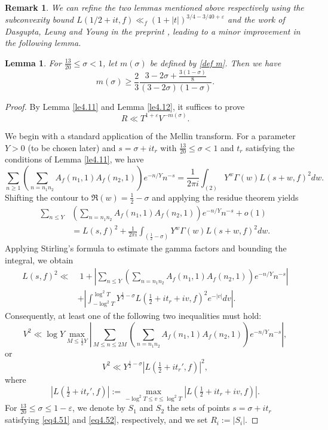 \documentclass[10pt,leqno]{amsart}
\numberwithin{equation}{section}
\newtheorem{lemma}[definition]{{Lemma}}
\newtheorem{remark}{{Remark}}
\begin{document}
\begin{remark}
    We can refine the two lemmas mentioned above respectively using the subconvexity bound $L(1/2+it,f)\ll_f(1+\left|t\right|)^{3/4-3/40+\varepsilon}$ \cite[Theorem 1.1]{MR4270876} and the work of Dasgupta, Leung and Young in the preprint \cite{arXiv:2407.06962}, leading to a minor improvement in the following lemma.
\end{remark}

\begin{lemma}
    For $\frac{13}{20}\leqslant \sigma <1$, let $m(\sigma)$ be defined by \eqref{def m}. Then we have
    \[
    m(\sigma)\geqslant \frac{2}{3}\frac{3-2\sigma+\frac{3(1-\sigma)}{8}}{(3-2\sigma)(1-\sigma)}.
    \]
\end{lemma}
\begin{proof}
By Lemma \ref{le4.11} and Lemma \ref{le4.12}, it suffices to prove
\[
R \ll T^{1+\varepsilon} V^{-m(\sigma)} .
\]

We begin with a standard application of the Mellin transform. For a parameter $Y > 0$ (to be chosen later) and $s = \sigma + i t_r$ with $\frac{13}{20} \le \sigma < 1$ and $t_r$ satisfying the conditions of Lemma \ref{le4.11}, we have
\[
\sum_{n \ge 1} \left( \sum_{n = n_1 n_2} A_f(n_1, 1) A_f(n_2, 1) \right) e^{-n / Y} n^{-s}
= \frac{1}{2 \pi i} \int_{(2)} Y^w \Gamma(w) L(s+w, f)^2   dw.
\]
Shifting the contour to $\Re(w) = \frac{1}{2} - \sigma$ and applying the residue theorem yields
\[
\begin{aligned}
\sum_{n \le Y } &\left( \sum_{n = n_1 n_2} A_f(n_1, 1) A_f(n_2, 1) \right) e^{-n / Y} n^{-s} + o(1) \\
&= L(s, f)^2 + \frac{1}{2 \pi i} \int_{\left(\frac{1}{2} - \sigma\right)} Y^w \Gamma(w) L(s+w, f)^2   dw.
\end{aligned}
\]
 Applying Stirling's formula to estimate the gamma factors and bounding the integral, we obtain
\[
\begin{aligned}
L(s, f)^2 \ll & \; 1 + \left| \sum_{n \le Y } \left( \sum_{n = n_1 n_2} A_f(n_1, 1) A_f(n_2, 1) \right) e^{-n / Y} n^{-s} \right| \\
& + \left| \int_{-\log^2 T}^{\log^2 T} Y^{\frac{1}{2} - \sigma} L\left(\tfrac{1}{2} + i t_r + i v, f\right)^2 e^{-|v|}   dv \right|.
\end{aligned}
\]
Consequently, at least one of the following two inequalities must hold:
\begin{equation}\label{eq4.51}
    V^2 \ll \log Y \max_{M \le \frac{1}{2} Y } \left| \sum_{M \le n \le 2M} \left( \sum_{n = n_1 n_2} A_f(n_1, 1) A_f(n_2, 1) \right) e^{-n / Y} n^{-s} \right|,
\end{equation}
or
\begin{equation}\label{eq4.52}
    V^2 \ll Y^{\frac{1}{2} - \sigma} \left| L\left( \tfrac{1}{2} + i t_r', f \right) \right|^2,
\end{equation}
where
\[
\left| L\left( \tfrac{1}{2} + i t_r', f \right) \right| := \max_{-\log^2 T \le v \le \log^2 T} \left| L\left( \tfrac{1}{2} + i t_r + i v, f \right) \right|.
\]
For $\frac{13}{20} \le \sigma \le 1 - \varepsilon$, we denote by $S_1$ and $S_2$ the sets of points $s = \sigma + i t_r$ satisfying \eqref{eq4.51} and \eqref{eq4.52}, respectively, and we set $R_i := |S_i|$.


\end{proof}
\end{document}
